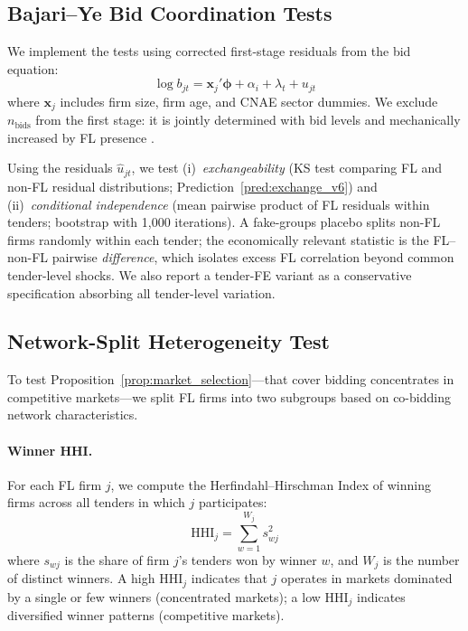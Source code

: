 
\subsection{Bajari--Ye Bid Coordination Tests}
\label{sec:bajari_ye}

We implement the \citet{bajari2003deciding} tests using corrected
first-stage residuals from the bid equation:
\begin{equation}
  \log b_{jt} = \mathbf{x}_j'\boldsymbol{\phi} + \alpha_i + \lambda_t
  + u_{jt}
  \label{eq:by_first_stage}
\end{equation}
where $\mathbf{x}_j$ includes firm size, firm age, and CNAE sector
dummies. We exclude $n_{\text{bids}}$ from the first stage: it is
jointly determined with bid levels and mechanically increased by FL
presence \citep[p.~978]{bajari2003deciding}.

Using the residuals $\hat{u}_{jt}$, we test (i)~\emph{exchangeability}
(KS test comparing FL and non-FL residual distributions;
Prediction~\ref{pred:exchange_v6}) and (ii)~\emph{conditional
independence} (mean pairwise product of FL residuals within tenders;
bootstrap with 1,000 iterations). A fake-groups placebo splits non-FL
firms randomly within each tender; the economically relevant statistic
is the FL--non-FL pairwise \emph{difference}, which isolates excess
FL correlation beyond common tender-level shocks. We also report a
tender-FE variant as a conservative specification absorbing all
tender-level variation.


\subsection{Network-Split Heterogeneity Test}
\label{sec:empirical_network}

To test Proposition~\ref{prop:market_selection}---that cover bidding
concentrates in competitive markets---we split FL firms into two
subgroups based on co-bidding network characteristics.

\paragraph{Winner HHI.}
For each FL firm $j$, we compute the Herfindahl--Hirschman Index of
winning firms across all tenders in which $j$ participates:
\begin{equation}
  \text{HHI}_j = \sum_{w=1}^{W_j} s_{wj}^2
  \label{eq:winner_hhi}
\end{equation}
where $s_{wj}$ is the share of firm $j$'s tenders won by winner $w$,
and $W_j$ is the number of distinct winners. A high $\text{HHI}_j$
indicates that $j$ operates in markets dominated by a single or few
winners (concentrated markets); a low $\text{HHI}_j$ indicates
diversified winner patterns (competitive markets).

